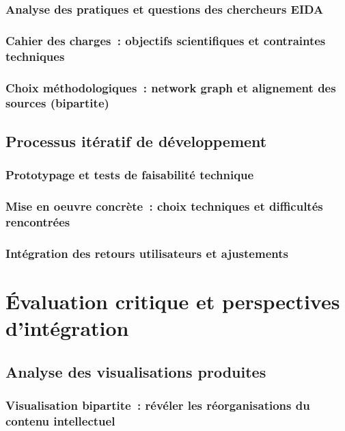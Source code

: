 \documentclass[a4paper,12pt,twoside]{book}
\newcommand{\clearemptydoublepage}{\newpage{\pagestyle{empty}\cleardoublepage}}
\begin{document}
	\section{Analyse des pratiques et questions des chercheurs EIDA}

	\section{Cahier des charges~: objectifs scientifiques et contraintes techniques}

	\section{Choix méthodologiques~: network graph et alignement des sources (bipartite)}

	\clearemptydoublepage

	\chapter{Processus itératif de développement}
	\section{Prototypage et tests de faisabilité technique}

	\section{Mise en oeuvre concrète~: choix techniques et difficultés rencontrées}

	\section{Intégration des retours utilisateurs et ajustements}

	\clearemptydoublepage

	\part{Évaluation critique et perspectives d'intégration}
	\chapter{Analyse des visualisations produites}
	\section{Visualisation bipartite~: révéler les réorganisations du contenu intellectuel}
\end{document}
